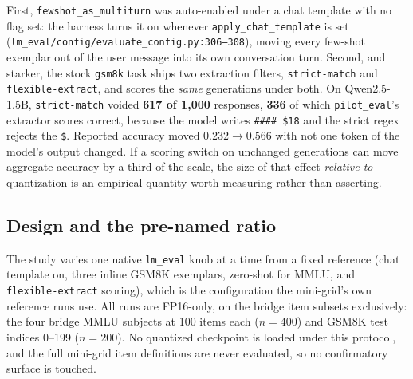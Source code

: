 First, \texttt{fewshot\_as\_multiturn} was auto-enabled under a chat template
with no flag set: the harness turns it on whenever \texttt{apply\_chat\_template}
is set (\texttt{lm\_eval/config/evaluate\_config.py:306--308}), moving every
few-shot exemplar out of the user message into its own conversation turn.
Second, and starker, the stock \texttt{gsm8k} task ships two extraction filters,
\texttt{strict-match} and \texttt{flexible-extract}, and scores the \emph{same}
generations under both. On Qwen2.5-1.5B, \texttt{strict-match} voided
\textbf{617 of 1{,}000} responses, \textbf{336} of which \texttt{pilot\_eval}'s
extractor scores correct, because the model writes \texttt{\#\#\#\# \$18} and the
strict regex rejects the \texttt{\$}. Reported accuracy moved
\textbf{$0.232 \to 0.566$} with not one token of the model's output changed.
If a scoring switch on unchanged generations can move aggregate accuracy by a
third of the scale, the size of that effect \emph{relative to} quantization is an
empirical quantity worth measuring rather than asserting.

\subsection{Design and the pre-named ratio}
\label{app:sensitivity:design}

The study varies one native \texttt{lm\_eval} knob at a time from a fixed
reference (chat template on, three inline GSM8K exemplars, zero-shot for MMLU,
and \texttt{flexible-extract} scoring), which is the configuration the mini-grid's
own reference runs use. All runs are FP16-only, on the bridge item subsets
exclusively: the four bridge MMLU subjects at 100 items each ($n=400$) and GSM8K
test indices 0--199 ($n=200$). No quantized checkpoint is loaded under this
protocol, and the full mini-grid item definitions are never evaluated, so no
confirmatory surface is touched.

